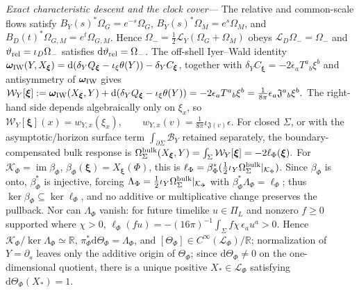\documentclass[aps,prl,reprint]{revtex4-2}
\newcommand{\dd}{\mathrm d}
\newcommand{\Lie}{\mathcal L}
\newcommand{\cK}{\mathcal K}
\begin{document}
\textit{Exact characteristic descent and the clock cover---}
The relative and common-scale flows satisfy $B_Y(s)^*\Omega_G=e^{-s}\Omega_G$, $B_Y(s)^*\Omega_M=e^s\Omega_M$, and $B_D(t)^*\Omega_{G,M}=e^t\Omega_{G,M}$. Hence $\Omega_-=\tfrac12\Lie_Y(\Omega_G+\Omega_M)$ obeys $\Lie_D\Omega_-=\Omega_-$ and $\vartheta_{\rm rel}=\iota_D\Omega_-$ satisfies $\dd\vartheta_{\rm rel}=\Omega_-$. The off-shell Iyer--Wald identity
$\boldsymbol\omega_{\rm IW}(Y,X_{\boldsymbol\xi})
=\dd(\delta_YQ_{\boldsymbol\xi}-\iota_\xi\theta(Y))
-\delta_YC_{\boldsymbol\xi}$,
together with
$\delta_YC_{\boldsymbol\xi}
=-2\epsilon_aT^a{}_b\xi^b$
and antisymmetry of $\boldsymbol\omega_{\rm IW}$ gives
$\mathcal W_Y[\boldsymbol\xi] := \boldsymbol\omega_{\rm IW}(X_{\boldsymbol\xi},Y) +\dd(\delta_YQ_{\boldsymbol\xi}-\iota_\xi\theta(Y)) = -2\epsilon_aT^a{}_b\xi^b = \frac1{8\pi} \epsilon_a\mathfrak J^a{}_b\xi^b .$
The right-hand side depends algebraically only on $\xi_x$, so
$\mathcal W_Y[\boldsymbol\xi](x) = w_{Y,x}(\xi_x), \qquad w_{Y,x}(v) = \frac1{8\pi} \iota_{\mathfrak J(v)}\epsilon .$
For closed $\Sigma$, or with the asymptotic/horizon surface term $\int_{\partial\Sigma}\mathcal B_Y$ retained separately, the boundary-compensated bulk response is $\Omega_\Sigma^{\rm bulk} (X_{\boldsymbol\xi},Y) = \int_\Sigma\mathcal W_Y[\boldsymbol\xi] = -2\ell_\Phi(\boldsymbol\xi).$
For $\cK_\Phi=\operatorname{im}\beta_\Phi$, $\beta_\Phi(\boldsymbol\xi)=X_{\boldsymbol\xi}(\Phi)$, this is $\ell_\Phi=\beta_\Phi^*(\tfrac12\iota_Y\Omega_{\Sigma}^{\rm bulk}|_{\cK_\Phi})$. Since $\beta_\Phi$ is onto, $\beta_\Phi^*$ is injective, forcing $\Lambda_\Phi=\tfrac12\iota_Y\Omega_{\Sigma}^{\rm bulk}|_{\cK_\Phi}$ with $\beta_\Phi^*\Lambda_\Phi=\ell_\Phi$; thus $\ker\beta_\Phi\subseteq\ker\ell_\Phi$, and no additive or multiplicative change preserves the pullback. Nor can $\Lambda_\Phi$ vanish: for future timelike $u\in\Pi_L$ and nonzero $f\ge0$ supported where $\chi>0$, $\ell_\Phi(fu)=-(16\pi)^{-1}\int_\Sigma f\chi\,\epsilon_a u^a>0$. Hence $\cK_\Phi/\ker\Lambda_\Phi\simeq\mathbb R$, $\pi_\Phi^*\dd\Theta_\Phi=\Lambda_\Phi$, and $[\Theta_\Phi]\in C^\infty(\mathcal L_\Phi)/\mathbb R$; normalization of $Y=\partial_s$ leaves only the additive origin of $\Theta_\Phi$; since $\dd\Theta_\Phi\neq0$ on the one-dimensional quotient, there is a unique positive $X_*\in\mathcal L_\Phi$ satisfying $\dd\Theta_\Phi(X_*)=1$.
\end{document}
